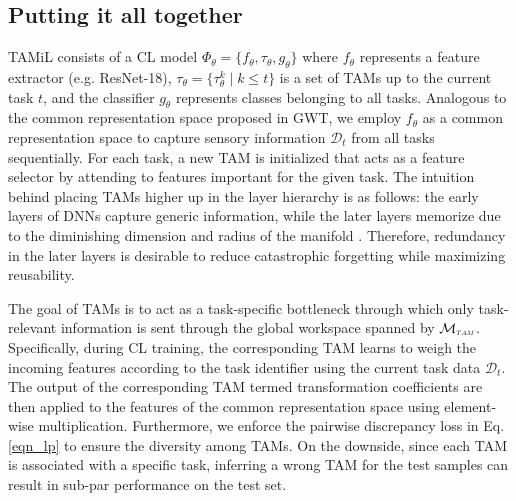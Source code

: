 \documentclass{article} %
\begin{document}
\subsection{Putting it all together}
TAMiL consists of a CL model $\Phi_\theta = \{ f_\theta, \tau_{\theta}, g_\theta\}$ where $f_\theta$ represents a feature extractor (e.g. ResNet-18), $\tau_{\theta} = \{\tau^{k}_{\theta} \mid k \leq t\}$ is a set of TAMs up to the current task $t$, and the classifier $g_\theta$ represents classes belonging to all tasks. Analogous to the common representation space proposed in GWT, we employ $f_\theta$ as a common representation space to capture sensory information $\mathcal{D}_t$ from all tasks sequentially. For each task, a new TAM is initialized that acts as a feature selector by attending to features important for the given task. The intuition behind placing TAMs higher up in the layer hierarchy is as follows: the early layers of DNNs capture generic information, while the later layers memorize due to the diminishing dimension and radius of the manifold \citep{stephenson2020geometry, baldock2021deep}.  Therefore, redundancy in the later layers is desirable to reduce catastrophic forgetting while maximizing reusability.  

The goal of TAMs is to act as a task-specific bottleneck through which only task-relevant information is sent through the global workspace spanned by $\mathcal{M}_{\scaleto{TAM}{3pt}}$. Specifically, during CL training, the corresponding TAM learns to weigh the incoming features according to the task identifier using the current task data $\mathcal{D}_t$. The output of the corresponding TAM termed transformation coefficients are then applied to the features of the common representation space using element-wise multiplication. Furthermore, we enforce the pairwise discrepancy loss in Eq. \ref{eqn_lp} to ensure the diversity among TAMs. On the downside, since each TAM is associated with a specific task, inferring a wrong TAM for the test samples can result in sub-par performance on the test set.
\end{document}
